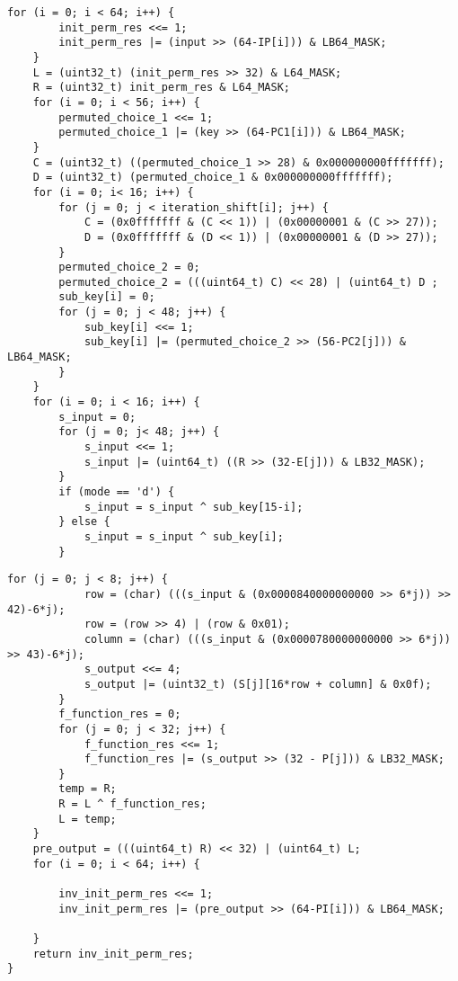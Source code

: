 \begin{center}
    \captionsetup{justification=raggedright,singlelinecheck=off}
    \begin{lstlisting}[label=lst:des2,caption=Реализация шифровального  алгоритма DES часть 2]
    for (i = 0; i < 64; i++) {
        init_perm_res <<= 1;
        init_perm_res |= (input >> (64-IP[i])) & LB64_MASK;
    }
    L = (uint32_t) (init_perm_res >> 32) & L64_MASK;
    R = (uint32_t) init_perm_res & L64_MASK;
    for (i = 0; i < 56; i++) {
        permuted_choice_1 <<= 1;
        permuted_choice_1 |= (key >> (64-PC1[i])) & LB64_MASK;
    }
    C = (uint32_t) ((permuted_choice_1 >> 28) & 0x000000000fffffff);
    D = (uint32_t) (permuted_choice_1 & 0x000000000fffffff);
    for (i = 0; i< 16; i++) {
        for (j = 0; j < iteration_shift[i]; j++) {
            C = (0x0fffffff & (C << 1)) | (0x00000001 & (C >> 27));
            D = (0x0fffffff & (D << 1)) | (0x00000001 & (D >> 27));
        }
        permuted_choice_2 = 0;
        permuted_choice_2 = (((uint64_t) C) << 28) | (uint64_t) D ;
        sub_key[i] = 0;
        for (j = 0; j < 48; j++) {
            sub_key[i] <<= 1;
            sub_key[i] |= (permuted_choice_2 >> (56-PC2[j])) & LB64_MASK;
        }
    }
    for (i = 0; i < 16; i++) {
        s_input = 0;
        for (j = 0; j< 48; j++) {
            s_input <<= 1;
            s_input |= (uint64_t) ((R >> (32-E[j])) & LB32_MASK);
        }
        if (mode == 'd') {
            s_input = s_input ^ sub_key[15-i];
        } else {
            s_input = s_input ^ sub_key[i];
        }
\end{lstlisting}
\end{center}

\clearpage

\begin{center}
    \captionsetup{justification=raggedright,singlelinecheck=off}
    \begin{lstlisting}[label=lst:des3,caption=Реализация шифровального  алгоритма DES часть 3]
        for (j = 0; j < 8; j++) {
            row = (char) (((s_input & (0x0000840000000000 >> 6*j)) >> 42)-6*j);
            row = (row >> 4) | (row & 0x01);
            column = (char) (((s_input & (0x0000780000000000 >> 6*j)) >> 43)-6*j);
            s_output <<= 4;
            s_output |= (uint32_t) (S[j][16*row + column] & 0x0f);
        }
        f_function_res = 0;
        for (j = 0; j < 32; j++) {
            f_function_res <<= 1;
            f_function_res |= (s_output >> (32 - P[j])) & LB32_MASK;
        }
        temp = R;
        R = L ^ f_function_res;
        L = temp;
    }
    pre_output = (((uint64_t) R) << 32) | (uint64_t) L;
    for (i = 0; i < 64; i++) {

        inv_init_perm_res <<= 1;
        inv_init_perm_res |= (pre_output >> (64-PI[i])) & LB64_MASK;

    }
    return inv_init_perm_res;
}
\end{lstlisting}
\end{center}

